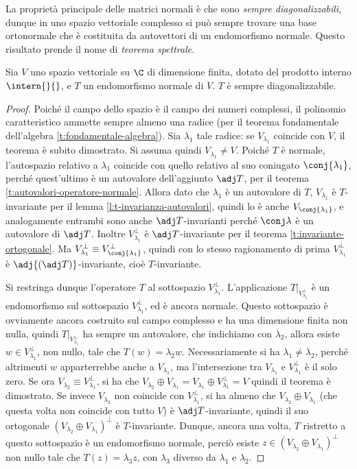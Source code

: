 La proprietà principale delle matrici normali è che sono \emph{sempre diagonalizzabili}, dunque in uno spazio vettoriale complesso si può sempre trovare una base ortonormale che è costituita da autovettori di un endomorfismo normale.
Questo risultato prende il nome di \emph{teorema spettrale}.
\begin{teorema} \label{t:spettrale}
	Sia $V$ uno spazio vettoriale su $\C$ di dimensione finita, dotato del prodotto interno $\intern{}{}$, e $T$ un endomorfismo normale di $V$.
	$T$ è sempre diagonalizzabile.
\end{teorema}
\begin{proof}
	Poiché il campo dello spazio è il campo dei numeri complessi, il polinomio caratteristico ammette sempre almeno una radice (per il teorema fondamentale dell'algebra \ref{t:fondamentale-algebra}).
	Sia $\lambda_1$ tale radice: se $V_{\lambda_1}$ coincide con $V$, il teorema è subito dimostrato.
	Si assuma quindi $V_{\lambda_1}\neq V$.
	Poiché $T$ è normale, l'autospazio relativo a $\lambda_1$ coincide con quello relativo al suo coniugato $\conj{\lambda_1}$, perché quest'ultimo è un autovalore dell'aggiunto $\adj T$, per il teorema \ref{t:autovalori-operatore-normale}.
	Allora dato che $\lambda_1$ è un autovalore di $T$, $V_{\lambda_1}$ è $T$-invariante per il lemma \ref{l:t-invarianza-autovalori}, quindi lo è anche $V_{\conj{\lambda_1}}
	$, e analogamente entrambi sono anche $\adj T$-invarianti perch\'e $\conj\lambda$ è un autovalore di $\adj T$.
	Inoltre $V_{\lambda_1}^\perp$ è $\adj T$-invariante per il teorema \ref{t:invariante-ortogonale}.
	Ma $V_{\lambda_1}^\perp\equiv V_{\conj{\lambda_1}}^\perp$, quindi con lo stesso ragionamento di prima $V_{\lambda_1}^\perp$ è $\adj{(\adj T)}$-invariante, cioè $T$-invariante.

	Si restringa dunque l'operatore $T$ al sottospazio $V_{\lambda_1}^\perp$. L'applicazione $T|_{V_{\lambda_1}^\perp}$ è un endomorfismo sul sottospazio $V_{\lambda_1}^\perp$, ed è ancora normale.
	Questo sottospazio è ovviamente ancora costruito sul campo complesso e ha una dimensione finita non nulla, quindi $T|_{V_{\lambda_1}^\perp}$ ha sempre un autovalore, che indichiamo con $\lambda_2$, allora esiste $  w\in V_{\lambda_1}^\perp$, non nullo, tale che $T(  w)=\lambda_2  w$.
	Necessariamente si ha $\lambda_1\neq\lambda_2$, perché altrimenti $  w$ apparterrebbe anche a $V_{\lambda_1}$, ma l'intersezione tra $V_{\lambda_1}$ e $V_{\lambda_1}^\perp$ è il solo zero.
	Se ora $V_{\lambda_2}\equiv V_{\lambda_1}^\perp$, si ha che $V_{\lambda_2}\oplus V_{\lambda_1}=V_{\lambda_1}\oplus V_{\lambda_1}^\perp=V$ quindi il teorema è dimostrato.
	Se invece $V_{\lambda_2}$ non coincide con $V_{\lambda_1}^\perp$, si ha almeno che $V_{\lambda_2}\oplus V_{\lambda_1}$ (che questa volta non coincide con tutto $V$) è $\adj T$-invariante, quindi il suo ortogonale $(V_{\lambda_2}\oplus V_{\lambda_1})^\perp$ è $T$-invariante.
	Dunque, ancora una volta, $T$ ristretto a questo sottospazio è un endomorfismo normale, perciò esiste $  z\in(V_{\lambda_2}\oplus V_{\lambda_1})^\perp$ non nullo tale che $T(  z)=\lambda_3  z$, con $\lambda_3$ diverso da $\lambda_1$ e $\lambda_2$.


\end{proof}

